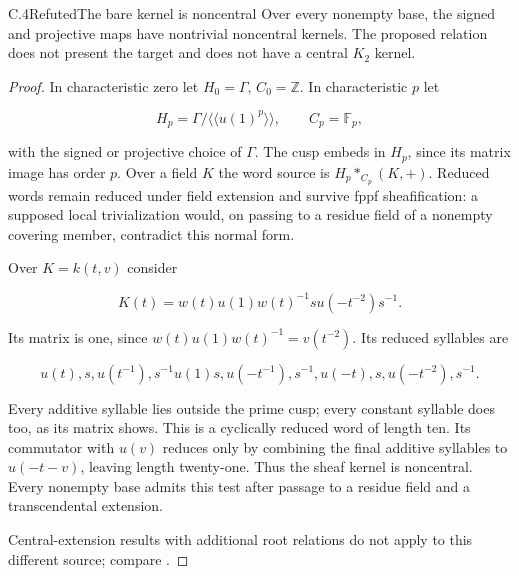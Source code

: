 \begin{statement}{C.4}{Refuted}{The bare kernel is noncentral}
Over every nonempty base, the signed and projective maps have
nontrivial noncentral kernels. The proposed relation does not
present the target and does not have a central $K_2$ kernel.
\end{statement}
\begin{proof}
In characteristic zero let $H_0=\Gamma$, $C_0=\mathbb Z$.
In characteristic $p$ let

$$
H_p=\Gamma/\langle\!\langle u(1)^p\rangle\!\rangle,\qquad
 C_p=\mathbb F_p,
$$

with the signed or projective choice of $\Gamma$.
The cusp embeds in $H_p$, since its matrix image has order $p$.
Over a field $K$ the word source is $H_p*_{C_p}(K,+)$.
Reduced words remain reduced under field extension and survive
fppf sheafification: a supposed local trivialization would,
on passing to a residue field of a nonempty covering member,
contradict this normal form.

Over $K=k(t,v)$ consider

$$
K(t)=w(t)u(1)w(t)^{-1}su(-t^{-2})s^{-1}.
$$

Its matrix is one, since $w(t)u(1)w(t)^{-1}=v(t^{-2})$.
Its reduced syllables are

$$
u(t),s,u(t^{-1}),s^{-1}u(1)s,u(-t^{-1}),s^{-1},
 u(-t),s,u(-t^{-2}),s^{-1}.
$$

Every additive syllable lies outside the prime cusp; every
constant syllable does too, as its matrix shows.
This is a cyclically reduced word of length ten.
Its commutator with $u(v)$ reduces only by combining the final
additive syllables to $u(-t-v)$, leaving length twenty-one.
Thus the sheaf kernel is noncentral. Every nonempty base
admits this test after passage to a residue field and a
transcendental extension.

Central-extension results with additional root relations do
not apply to this different source; compare
\citet[Introduction and Theorem 4.7]{C_BrylinskiDeligne2001}.
\end{proof}

